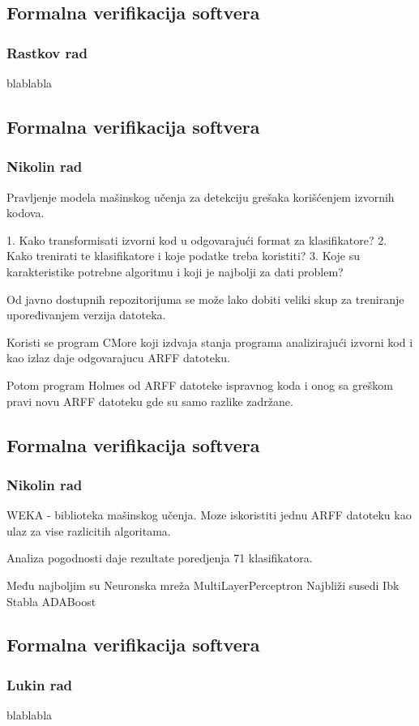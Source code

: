 \documentclass[11pt]{beamer}
\theoremstyle{definition}
\begin{document}
\subsection{Formalna verifikacija softvera}
\label{subsec:formalna-verifikacija}
\begin{frame}
\frametitle{Rastkov rad}
blablabla
\end{frame}

\subsection{Formalna verifikacija softvera}
\label{subsec:formalna-verifikacija}
\begin{frame}
\frametitle{Nikolin rad}
Pravljenje modela mašinskog učenja za detekciju grešaka korišćenjem izvornih kodova.

1. Kako transformisati izvorni kod u odgovarajući format za klasifikatore?
2. Kako trenirati te klasifikatore i koje podatke treba koristiti?
3. Koje su karakteristike potrebne algoritmu i koji je najbolji za dati problem?

Od javno dostupnih repozitorijuma se može lako dobiti veliki skup za treniranje upoređivanjem verzija datoteka.

Koristi se program CMore koji izdvaja stanja programa analizirajući izvorni kod
i kao izlaz daje odgovarajucu ARFF datoteku.

Potom program Holmes od ARFF datoteke ispravnog koda i onog sa greškom pravi novu ARFF datoteku
gde su samo razlike zadržane.
\end{frame}

\subsection{Formalna verifikacija softvera}
\label{subsec:formalna-verifikacija}
\begin{frame}
\frametitle{Nikolin rad}
WEKA - biblioteka mašinskog učenja.
Moze iskoristiti jednu ARFF datoteku kao ulaz za vise razlicitih algoritama.

Analiza pogodnosti daje rezultate poredjenja 71 klasifikatora.

Među najboljim su
Neuronska mreža MultiLayerPerceptron
Najbliži susedi Ibk
Stabla ADABoost
\end{frame}



\subsection{Formalna verifikacija softvera}
\label{subsec:formalna-verifikacija}
\begin{frame}
\frametitle{Lukin rad}
blablabla
\end{frame}
\end{document}
